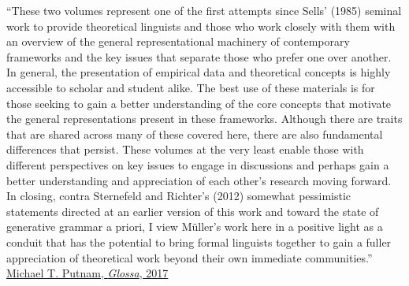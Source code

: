{\medskip
\noindent
``These two volumes represent one of the first attempts since Sells' (1985) seminal work to provide
theoretical linguists and those who work closely with them with an overview of the general
representational machinery of contemporary frameworks and the key issues that separate those who
prefer one over another. In general, the presentation of empirical data and theoretical concepts is
highly accessible to scholar and student alike. The best use of these materials is for those seeking
to gain a better understanding of the core concepts that motivate the general representations
present in these frameworks. Although there are traits that are shared across many of these covered
here, there are also fundamental differences that persist. These volumes at the very least enable
those with different perspectives on key issues to engage in discussions and perhaps gain a better
understanding and appreciation of each other's research moving forward. In closing, contra
Sternefeld and Richter's (2012) somewhat pessimistic statements directed at an earlier version of
this work and toward the state of generative grammar a priori, I view Müller's work here in a
positive light as a conduit that has the potential to bring formal linguists together to gain a
fuller appreciation of theoretical work beyond their own immediate communities.'' \href{http://doi.org/10.5334/gjgl.414}{Michael T. Putnam, \emph{Glossa}, 2017}




}
\dedication{For Max}
\renewcommand{\lsISBNdigital}{978-3-96110-202-0}
\renewcommand{\lsISBNhardcover}{978-3-96110-220-4} %
\renewcommand{\lsISBNsoftcover}{978-3-96110-221-1} %
\renewcommand{\lsBookDOI}{10.5281/zenodo.3364215} %
\renewcommand{\lsSeries}{tbls} %
\renewcommand{\lsSeriesNumber}{1} %
\renewcommand{\lsID}{25} %
\renewcommand{\lsURL}{http://langsci-press.org/catalog/book/255} %
\renewcommand{\lsSeries}{tbls}


